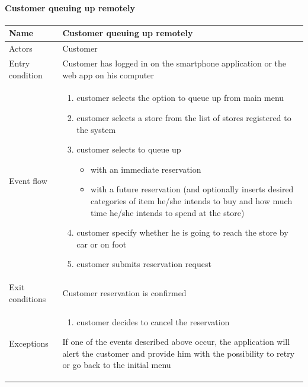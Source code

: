 \paragraph{Customer queuing up remotely}
\begin{flushleft}
	\begin{tabular} { | m{3cm} | m{10cm} | }
		\hline
		Name & Customer queuing up remotely\\
		\hline
		Actors & Customer\\
		\hline
		Entry condition & Customer has logged in on the smartphone application or the web app on his computer\\
		\hline
		Event flow & \begin{enumerate}
			\item customer selects the option to queue up from main menu
			\item customer selects a store from the list of stores registered to the system
			\item customer selects to queue up
			\begin{itemize}
				\item with an immediate reservation
				\item with a future reservation (and optionally inserts desired categories of item he/she intends to buy and how much time he/she intends to spend at the store)
			\end{itemize}
			\item customer specify  whether he is going to reach the store by car or on foot
			\item customer submits reservation request
		\end{enumerate}\\
		\hline
		Exit conditions & Customer reservation is confirmed\\
		\hline
		Exceptions & \begin{enumerate}
			\item customer decides to cancel the reservation
		\end{enumerate}
		If one of the events described above occur, the application will alert the customer and provide him with the possibility to retry or go back to the initial menu\\
		\hline
	\end{tabular}
\end{flushleft}


